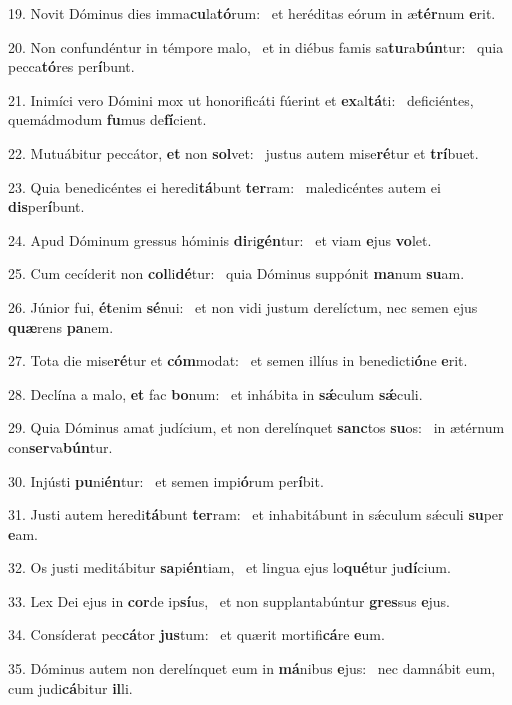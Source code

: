 19. Novit Dóminus dies imma\textbf{cu}la\textbf{tó}rum: \ast\  et heréditas eórum in æ\textbf{tér}num \textbf{e}rit.\

20. Non confundéntur in témpore malo, \dag\  et in diébus famis sa\textbf{tu}ra\textbf{bún}tur: \ast\  quia pecca\textbf{tó}res per\textbf{í}bunt.\

21. Inimíci vero Dómini mox ut honorificáti fúerint et \textbf{ex}al\textbf{tá}ti: \ast\  deficiéntes, quemádmodum \textbf{fu}mus de\textbf{fí}cient.\

22. Mutuábitur peccátor, \textbf{et} non \textbf{sol}vet: \ast\  justus autem mise\textbf{ré}tur et \textbf{trí}buet.\

23. Quia benedicéntes ei heredi\textbf{tá}bunt \textbf{ter}ram: \ast\  maledicéntes autem ei \textbf{dis}per\textbf{í}bunt.\

24. Apud Dóminum gressus hóminis \textbf{di}ri\textbf{gén}tur: \ast\  et viam \textbf{e}jus \textbf{vo}let.\

25. Cum cecíderit non \textbf{col}li\textbf{dé}tur: \ast\  quia Dóminus suppónit \textbf{ma}num \textbf{su}am.\

26. Júnior fui, \textbf{ét}enim \textbf{sé}nui: \ast\  et non vidi justum derelíctum, nec semen ejus \textbf{quæ}rens \textbf{pa}nem.\

27. Tota die mise\textbf{ré}tur et \textbf{cóm}modat: \ast\  et semen illíus in benedicti\textbf{ó}ne \textbf{e}rit.\

28. Declína a malo, \textbf{et} fac \textbf{bo}num: \ast\  et inhábita in \textbf{sǽ}culum \textbf{sǽ}culi.\

29. Quia Dóminus amat judícium, et non derelínquet \textbf{sanc}tos \textbf{su}os: \ast\  in ætérnum con\textbf{ser}va\textbf{bún}tur.\

30. Injústi \textbf{pu}ni\textbf{én}tur: \ast\  et semen impi\textbf{ó}rum per\textbf{í}bit.\

31. Justi autem heredi\textbf{tá}bunt \textbf{ter}ram: \ast\  et inhabitábunt in sǽculum sǽculi \textbf{su}per \textbf{e}am.\

32. Os justi meditábitur \textbf{sa}pi\textbf{én}tiam, \ast\  et lingua ejus lo\textbf{qué}tur ju\textbf{dí}cium.\

33. Lex Dei ejus in \textbf{cor}de ip\textbf{sí}us, \ast\  et non supplantabúntur \textbf{gres}sus \textbf{e}jus.\

34. Consíderat pec\textbf{cá}tor \textbf{jus}tum: \ast\  et quærit mortifi\textbf{cá}re \textbf{e}um.\

35. Dóminus autem non derelínquet eum in \textbf{má}nibus \textbf{e}jus: \ast\  nec damnábit eum, cum judi\textbf{cá}bitur \textbf{il}li.\

